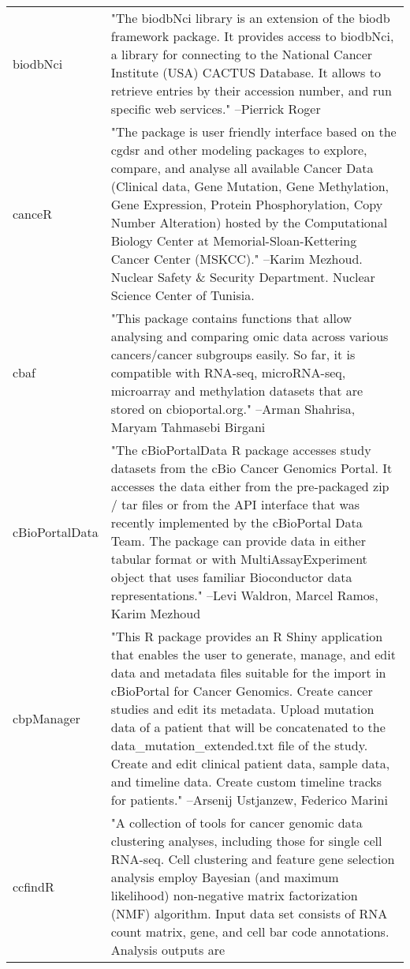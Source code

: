 \begin{longtable}[t]{l>{\raggedright\arraybackslash}p{25em}}
biodbNci & "The biodbNci library is an extension of the biodb
framework package. It provides access to biodbNci, a library
for connecting to the National Cancer Institute (USA) CACTUS
Database. It allows to retrieve entries by their accession
number, and run specific web services." --Pierrick Roger\\
\addlinespace
canceR & "The package is user friendly interface based on the cgdsr
and other modeling packages to explore, compare, and analyse
all available Cancer Data (Clinical data, Gene Mutation, Gene
Methylation, Gene Expression, Protein Phosphorylation, Copy
Number Alteration) hosted by the Computational Biology Center
at Memorial-Sloan-Kettering Cancer Center (MSKCC)." --Karim Mezhoud. Nuclear Safety \& Security Department. Nuclear Science Center of Tunisia.\\
cbaf & "This package contains functions that allow analysing and
comparing omic data across various cancers/cancer subgroups
easily. So far, it is compatible with RNA-seq, microRNA-seq,
microarray and methylation datasets that are stored on
cbioportal.org." --Arman Shahrisa, Maryam Tahmasebi Birgani\\
cBioPortalData & "The cBioPortalData R package accesses study datasets from
the cBio Cancer Genomics Portal. It accesses the data either
from the pre-packaged zip / tar files or from the API interface
that was recently implemented by the cBioPortal Data Team. The
package can provide data in either tabular format or with
MultiAssayExperiment object that uses familiar Bioconductor
data representations." --Levi Waldron, Marcel Ramos, Karim Mezhoud\\
cbpManager & "This R package provides an R Shiny application that
enables the user to generate, manage, and edit data and
metadata files suitable for the import in cBioPortal for Cancer
Genomics. Create cancer studies and edit its metadata. Upload
mutation data of a patient that will be concatenated to the
data\_mutation\_extended.txt file of the study. Create and edit
clinical patient data, sample data, and timeline data. Create
custom timeline tracks for patients." --Arsenij Ustjanzew, Federico Marini\\
ccfindR & "A collection of tools for cancer genomic data clustering
analyses, including those for single cell RNA-seq. Cell
clustering and feature gene selection analysis employ Bayesian
(and maximum likelihood) non-negative matrix factorization
(NMF) algorithm. Input data set consists of RNA count matrix,
gene, and cell bar code annotations.  Analysis outputs are

\end{longtable}
